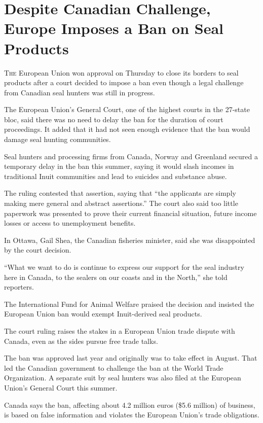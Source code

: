 ﻿\documentclass[12pt]{article}
\begin{document}
\section{Despite Canadian Challenge, Europe Imposes a Ban on Seal Products}

\lettrine{T}{he} European Union won approval on Thursday to close its
borders to seal products after a court decided to impose a ban even though a legal challenge from
Canadian seal hunters was still in progress.

The European Union's General Court, one of the highest courts in the 27-state bloc, said there was
no need to delay the ban for the duration of court proceedings. It added that it had not seen enough
evidence that the ban would damage seal hunting communities.

Seal hunters and processing firms from Canada, Norway and Greenland secured a temporary delay in the
ban this summer, saying it would slash incomes in traditional Inuit communities and lead to suicides
and substance abuse.

The ruling contested that assertion, saying that ``the applicants are simply making mere general and
abstract assertions.'' The court also said too little paperwork was presented to prove their current
financial situation, future income losses or access to unemployment benefits.

In Ottawa, Gail Shea, the Canadian fisheries minister, said she was disappointed by the court
decision.

``What we want to do is continue to express our support for the seal industry here in Canada, to the
sealers on our coasts and in the North,'' she told reporters.

The International Fund for Animal Welfare praised the decision and insisted the European Union ban
would exempt Inuit-derived seal products.

The court ruling raises the stakes in a European Union trade dispute with Canada, even as the sides
pursue free trade talks.

The ban was approved last year and originally was to take effect in August. That led the Canadian
government to challenge the ban at the World Trade Organization. A separate suit by seal hunters was
also filed at the European Union's General Court this summer.

Canada says the ban, affecting about 4.2 million euros (\$5.6 million) of business, is based on
false information and violates the European Union's trade obligations.
\end{document}
